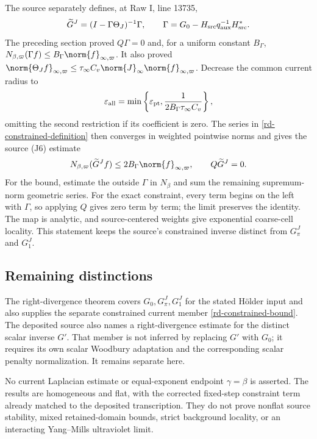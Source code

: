 The source separately defines, at Raw I, line 13735,
\begin{equation}\label{rd-constrained-definition}
 \widetilde G^J=(I-\Gamma\Theta_J)^{-1}\Gamma,
 \qquad
 \Gamma=G_0-H_{\rm src}q_{\rm aux}^{-1}H_{\rm src}^*.
\end{equation}
The preceding section proved $Q\Gamma=0$ and, for a uniform
constant $B_\Gamma$,
$N_{\beta,\varpi}(\Gamma f)
 \le B_\Gamma\norm{f}_{\infty,\varpi}$.
It also proved
$\norm{\Theta_Jf}_{\infty,\varpi}
 \le\tau_\infty C_v\norm{J}_\infty
                      \norm{f}_{\infty,\varpi}$.
Decrease the common current radius to
\begin{equation}\label{rd-constrained-radius}
 \varepsilon_{\rm all}
  =\min\left\{\varepsilon_{\rm pt},
             \frac1{2B_\Gamma\tau_\infty C_v}\right\},
\end{equation}
omitting the second restriction if its coefficient is zero.
The series in \eqref{rd-constrained-definition} then converges in
weighted pointwise norms and gives the source (J6) estimate
\begin{equation}\label{rd-constrained-bound}
 N_{\beta,\varpi}(\widetilde G^Jf)
           \le2B_\Gamma\norm{f}_{\infty,\varpi},\qquad
                 Q\widetilde G^J=0.
\end{equation}
For the bound, estimate the outside $\Gamma$ in $N_\beta$ and
sum the remaining supremum-norm geometric series. For the exact
constraint, every term begins on the left with $\Gamma$, so applying
$Q$ gives zero term by term; the limit preserves the identity.
The map is analytic, and source-centered weights give exponential
coarse-cell locality. This statement keeps the source's constrained
inverse distinct from $G_\pi^J$ and $G_1^J$.

\subsection{Remaining distinctions}

The right-divergence theorem covers $G_0,G_\pi^J,G_1^J$ for the
stated H\"older input and also supplies the separate constrained
current member \eqref{rd-constrained-bound}. The deposited source
also names a right-divergence estimate for the distinct scalar
inverse $G'$. That member is not inferred by replacing $G'$ with
$G_0$; it requires its own scalar Woodbury adaptation and the
corresponding scalar penalty normalization. It remains separate here.

No current Laplacian estimate or equal-exponent endpoint
$\gamma=\beta$ is asserted. The results are homogeneous and flat,
with the corrected fixed-step constraint term already matched to
the deposited transcription. They do not prove nonflat source
stability, mixed retained-domain bounds, strict background locality,
or an interacting Yang--Mills ultraviolet limit.

